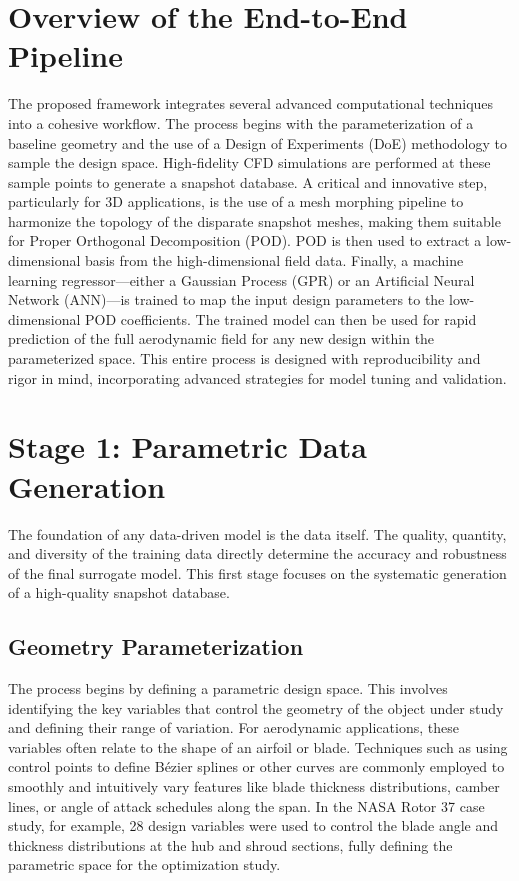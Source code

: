 \documentclass[dsc, EN]{ufabcFHZh}
\begin{document}
{\section{Overview of the End-to-End Pipeline}

The proposed framework integrates several advanced computational techniques into a cohesive workflow. The process begins with the parameterization of a baseline geometry and the use of a Design of Experiments (DoE) methodology to sample the design space. High-fidelity CFD simulations are performed at these sample points to generate a snapshot database. A critical and innovative step, particularly for 3D applications, is the use of a mesh morphing pipeline to harmonize the topology of the disparate snapshot meshes, making them suitable for Proper Orthogonal Decomposition (POD). POD is then used to extract a low-dimensional basis from the high-dimensional field data. Finally, a machine learning regressor—either a Gaussian Process (GPR) or an Artificial Neural Network (ANN)—is trained to map the input design parameters to the low-dimensional POD coefficients. The trained model can then be used for rapid prediction of the full aerodynamic field for any new design within the parameterized space. This entire process is designed with reproducibility and rigor in mind, incorporating advanced strategies for model tuning and validation.


\section{Stage 1: Parametric Data Generation}

The foundation of any data-driven model is the data itself. The quality, quantity, and diversity of the training data directly determine the accuracy and robustness of the final surrogate model. This first stage focuses on the systematic generation of a high-quality snapshot database.


\subsection{Geometry Parameterization}

The process begins by defining a parametric design space. This involves identifying the key variables that control the geometry of the object under study and defining their range of variation. For aerodynamic applications, these variables often relate to the shape of an airfoil or blade. Techniques such as using control points to define Bézier splines or other curves are commonly employed to smoothly and intuitively vary features like blade thickness distributions, camber lines, or angle of attack schedules along the span. In the NASA Rotor 37 case study, for example, 28 design variables were used to control the blade angle and thickness distributions at the hub and shroud sections, fully defining the parametric space for the optimization study.

}
\end{document}
